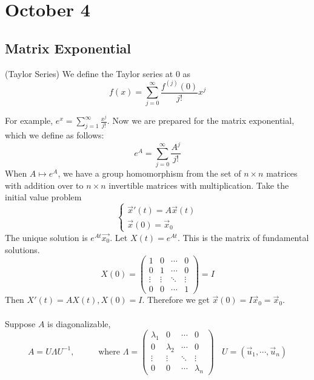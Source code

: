 \documentclass{article}
\theoremstyle{definition}
\begin{document}
\section{October 4}
    \subsection{Matrix Exponential}
        \begin{mdframed}(Taylor Series)
            We define the Taylor series at 0 as 
            \[
                f(x) = \sum_{j=0}^\infty \frac{f^{(j)}(0)}{j!}x^j
            \]
        \end{mdframed}
        For example, $e^x = \sum_{j=1}^\infty \frac{x^j}{j!}$.
        Now we are prepared for the matrix exponential, which we define as follows:
        \[
            e^A = \sum_{j=0}^\infty \frac{A^j}{j!}
        \]
        When $A \mapsto e^A$, we have a group homomorphism from the set 
        of $n \times n$ matrices with addition over to $n \times n$ invertible matrices with
        multiplication.
        Take the initial value problem
        \[
            \begin{cases}
                \vec x'(t) = A\vec x (t) \\
                \vec x(0) = \vec x_0
            \end{cases}
        \]
        The unique solution is $e^{At}\vec{x_0}$.
        Let $X(t) = e^{At}$. This is the matrix of fundamental solutions.
        \[
            X(0) = \begin{pmatrix}
                1 & 0 & \cdots & 0 \\
                0 & 1 & \cdots & 0 \\
                \vdots & \vdots & \ddots & \vdots \\
                0 & 0 & \cdots & 1
            \end{pmatrix} = I
        \]
        Then $X'(t) = AX(t), X(0) = I$. Therefore we get 
        $\vec x(0) = I\vec x_0 = \vec x_0$.\\\\
        Suppose $A$ is diagonalizable,
        \[
            A = U \Lambda U^{-1}, \ \ \ \ \ \ \ \ \ \ \ \text{ where } \Lambda = \begin{pmatrix}
                \lambda_1 & 0 & \cdots & 0 \\
                0 & \lambda_2 & \cdots & 0 \\
                \vdots & \vdots & \ddots & \vdots \\
                0 & 0 & \cdots & \lambda_n
            \end{pmatrix} \ \ \ \ U = (\vec u_1, \cdots , \vec u_n)
        \]
\end{document}
